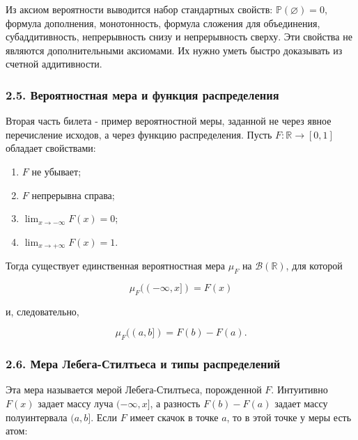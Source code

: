 \documentclass[
  11pt,
  a4paper,
]{article}
\providecommand{\tightlist}{%
  \setlength{\itemsep}{0pt}\setlength{\parskip}{0pt}}
\begin{document}
Из аксиом вероятности выводится набор стандартных свойств:
\(\mathbb P(\varnothing)=0\), формула дополнения, монотонность, формула
сложения для объединения, субаддитивность, непрерывность снизу и
непрерывность сверху. Эти свойства не являются дополнительными
аксиомами. Их нужно уметь быстро доказывать из счетной аддитивности.

\subsubsection{2.5. Вероятностная мера и функция
распределения}\label{ux432ux435ux440ux43eux44fux442ux43dux43eux441ux442ux43dux430ux44f-ux43cux435ux440ux430-ux438-ux444ux443ux43dux43aux446ux438ux44f-ux440ux430ux441ux43fux440ux435ux434ux435ux43bux435ux43dux438ux44f}

Вторая часть билета - пример вероятностной меры, заданной не через явное
перечисление исходов, а через функцию распределения. Пусть
\(F:\mathbb R\to[0,1]\) обладает свойствами:

\begin{enumerate}
\def\labelenumi{\arabic{enumi}.}
\tightlist
\item
  \(F\) не убывает;
\item
  \(F\) непрерывна справа;
\item
  \(\lim_{x\to-\infty}F(x)=0\);
\item
  \(\lim_{x\to+\infty}F(x)=1\).
\end{enumerate}

Тогда существует единственная вероятностная мера \(\mu_F\) на
\(\mathcal B(\mathbb R)\), для которой

\[
\mu_F((-\infty,x])=F(x)
\]

и, следовательно,

\[
\mu_F((a,b])=F(b)-F(a).
\]

\subsubsection{2.6. Мера Лебега-Стилтьеса и типы
распределений}\label{ux43cux435ux440ux430-ux43bux435ux431ux435ux433ux430-ux441ux442ux438ux43bux442ux44cux435ux441ux430-ux438-ux442ux438ux43fux44b-ux440ux430ux441ux43fux440ux435ux434ux435ux43bux435ux43dux438ux439}

Эта мера называется мерой Лебега-Стилтьеса, порожденной \(F\).
Интуитивно \(F(x)\) задает массу луча \((-\infty,x]\), а разность
\(F(b)-F(a)\) задает массу полуинтервала \((a,b]\). Если \(F\) имеет
скачок в точке \(a\), то в этой точке у меры есть атом:
\end{document}
